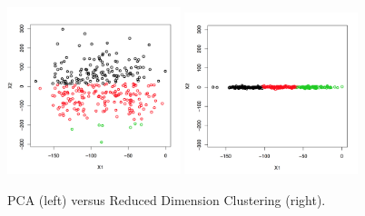 \documentclass[simplex.tex]{subfiles}
\begin{document}
\begin{figure}[h!]
\begin{cframed}
\centering
\includegraphics[width=0.45\textwidth]{../../figs/pcaBased.png}
\includegraphics[width=0.45\textwidth]{../../figs/ARC.png}
\caption{PCA (left) versus Reduced Dimension Clustering (right).}
\label{fig:arc}
\end{cframed}
\end{figure}
\end{document}

